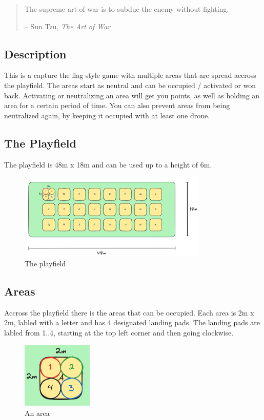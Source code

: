 \begin{quote}
    The supreme art of war is to subdue the enemy without fighting. 
    \begin{flushright}
        -- Sun Tzu, \textit{The Art of War}
    \end{flushright}
\end{quote}

\subsection{Description}
This is a capture the flag style game with multiple areas that are spread accross the playfield. The areas start as neutral and can be occupied / activated or won back. Activating or neutralizing an area will get you points, as well as holding an area for a certain period of time. You can also prevent areas from being neutralized again, by keeping it occupied with at least one drone.

\subsection{The Playfield}
The playfield is 48m x 18m and can be used up to a height of 6m.
\begin{figure}[h]
    \centering
    \includegraphics[width=0.8\textwidth]{figures/field.png}
    \caption{The playfield}
    \label{fig:playfield}
\end{figure}

\subsection{Areas}
Accross the playfield there is the areas that can be occupied. Each area is 2m x 2m, labled with a letter and has 4 designated landing pads. The landing pads are labled from 1..4, starting at the top left corner and then going clockwise.
\begin{figure}[h]
    \centering
    \includegraphics[width=0.3\textwidth]{figures/area.png}
    \caption{An area}
    \label{fig:area}
\end{figure}

